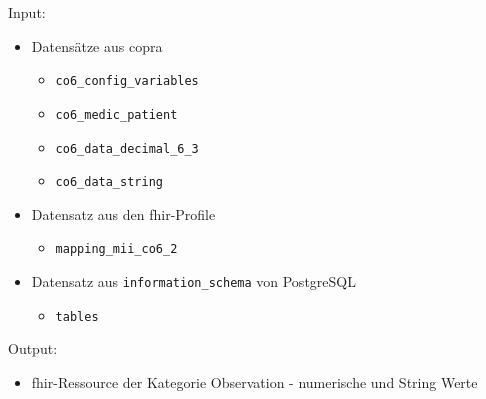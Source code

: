 \noindent Input:
\begin{itemize}
	\item Datensätze aus \ac{copra}
	\begin{itemize}
	\item \texttt{co6\_config\_variables}
	\item \texttt{co6\_medic\_patient}
	\item \texttt{co6\_data\_decimal\_6\_3} 
	\item \texttt{co6\_data\_string}
	\end{itemize}
	\item Datensatz aus den \ac{fhir}-Profile
	\begin{itemize}
	 \item \texttt{mapping\_mii\_co6\_2}
    \end{itemize}
	\item Datensatz aus \texttt{information\_schema} von PostgreSQL
\begin{itemize}
	\item \texttt{tables}
\end{itemize}
\end{itemize}
Output:
\begin{itemize}
	\item \ac{fhir}-Ressource der Kategorie \glqq Observation\grqq{} - numerische und String Werte
\end{itemize}

